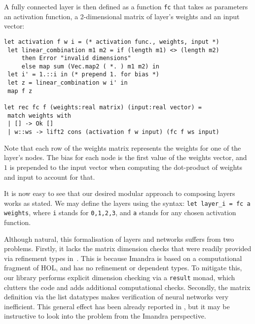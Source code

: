 \documentclass[runningheads]{llncs}
\begin{document}



A fully connected layer is then defined as a function \lstinline{fc} that takes
as parameters an activation function, a 2-dimensional matrix of
layer's weights and an input vector:
\begin{lstlisting}[caption=Fully connected layer implementation, language=caml, label={lst:fully_connected}]
let activation f w i = (* activation func., weights, input *)
 let linear_combination m1 m2 = if (length m1) <> (length m2)
     then Error "invalid dimensions" 
     else map sum (Vec.map2 ( *. ) m1 m2) in
 let i' = 1.::i in (* prepend 1. for bias *)
 let z = linear_combination w i' in
 map f z
	
let rec fc f (weights:real matrix) (input:real vector) =
 match weights with
 | [] -> Ok []
 | w::ws -> lift2 cons (activation f w input) (fc f ws input)
\end{lstlisting}

Note that each row of the weights matrix
represents the weights for one of the layer's nodes. The bias for each node is
the first value of the weights vector, and $1$ is prepended to the input vector
when computing the dot-product of weights and input to account for that.



  It is now easy to see that our desired modular approach to composing layers works as stated. We may define the layers using the syntax:
  \lstinline{let layer_i = fc a weights}, where \lstinline{i} stands for \lstinline{0,1,2,3}, and \lstinline{a} stands for any chosen activation function. 

  Although natural, this formalisation of layers and networks suffers from two problems.  Firstly, it lacks the matrix dimension checks that were readily provided  via refinement types in~\cite{KokkeKKAA20}. This is because Imandra is based on a computational fragment of HOL, and has no refinement or dependent types. To mitigate this, our library performs explicit dimension checking via a {\tt result} monad, which clutters the code and adds additional computational checks.
  Secondly, the matrix definition via the list datatypes makes verification of neural networks very inefficient.
  This general effect has been already reported in \cite{KokkeKKAA20}, but it may be instructive to look into the problem from the Imandra perspective.
\end{document}
